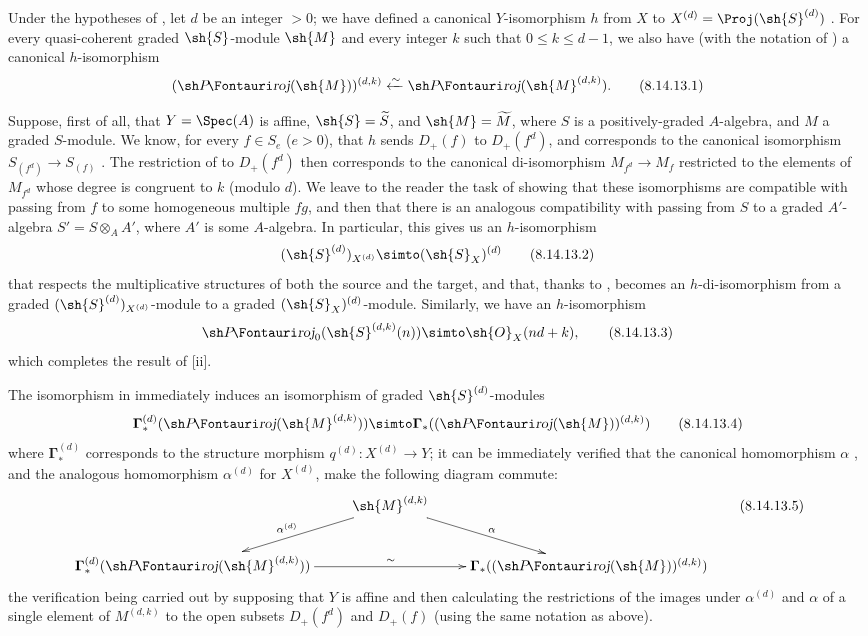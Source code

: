 \begin{remark}[8.14.13]
\label{II.8.14.13}
Under the hypotheses of , let $d$ be an integer $>0$;
we have defined a canonical $Y$-isomorphism $h$ from $X$ to $X^{(d)}=\Proj(\sh{S}^{(d)})$ .
For every
quasi-coherent graded $\sh{S}$-module $\sh{M}$ and every integer $k$ such that $0\leq k\leq d-1$, we also have (with the notation of ) a canonical $h$-isomorphism
\[
\label{II.8.14.13.1}
    (\shProj(\sh{M}))^{(d,k)} \xleftarrow{\sim} \shProj(\sh{M}^{(d,k)}).
\tag{8.14.13.1}
\]

Suppose, first of all, that $Y=\Spec(A)$ is affine, $\sh{S}=\widetilde{S}$, and $\sh{M}=\widetilde{M}$, where $S$ is a positively-graded $A$-algebra, and $M$ a graded $S$-module.
We know, for every $f\in S_e$ ($e>0$), that $h$ sends $D_+(f)$ to $D_+(f^d)$, and corresponds to the canonical isomorphism $S_{(f^d)}\to S_{(f)}$ .
The restriction of  to $D_+(f^d)$ then corresponds to the canonical di-isomorphism $M_{f^d}\to M_f$ restricted to the elements of $M_{f^d}$ whose degree is congruent to $k$ (modulo $d$).
We leave to the reader the task of showing that these isomorphisms are compatible with passing from $f$ to some homogeneous multiple $fg$, and then that there is an analogous compatibility with passing from $S$ to a graded $A'$-algebra $S'=S\otimes_A A'$, where $A'$ is some $A$-algebra.
In particular, this gives us an $h$-isomorphism
\[
\label{II.8.14.13.2}
    (\sh{S}^{(d)})_{X^{(d)}} \simto (\sh{S}_X)^{(d)}
\tag{8.14.13.2}
\]
that respects the multiplicative structures of both the source and the target, and that, thanks to , becomes an $h$-di-isomorphism from a graded $(\sh{S}^{(d)})_{X^{(d)}}$-module to a graded $(\sh{S}_X)^{(d)}$-module.
Similarly, we have an $h$-isomorphism
\[
\label{II.8.14.13.3}
    \shProj_0(\sh{S}^{(d,k)}(n)) \simto \sh{O}_X(nd+k),
\tag{8.14.13.3}
\]
which completes the result of [ii].

The isomorphism in  immediately induces an isomorphism of graded $\sh{S}^{(d)}$-modules
\[
\label{II.8.14.13.4}
    \boldsymbol{\Gamma}_*^{(d)}(\shProj(\sh{M}^{(d,k)})) \simto \boldsymbol{\Gamma}_*((\shProj(\sh{M}))^{(d,k)})
\tag{8.14.13.4}
\]
where $\boldsymbol{\Gamma}_*^{(d)}$ corresponds to the structure morphism $q^{(d)}:X^{(d)}\to Y$;
it can be immediately verified that the canonical homomorphism $\alpha$ , and the analogous homomorphism $\alpha^{(d)}$ for $X^{(d)}$, make the following diagram commute:
\[
\label{II.8.14.13.5}
    \xymatrix{
        &\sh{M}^{(d,k)} \ar[dl]_{\alpha^{(d)}} \ar[dr]^{\alpha}&
    \\  \boldsymbol{\Gamma}_*^{(d)}(\shProj(\sh{M}^{(d,k)})) \ar[rr]^{\sim}
        && \boldsymbol{\Gamma}_*((\shProj(\sh{M}))^{(d,k)})
    }
\tag{8.14.13.5}
\]
the verification being carried out by supposing that $Y$ is affine and then calculating the restrictions of the images under $\alpha^{(d)}$ and $\alpha$ of a single element of $M^{(d,k)}$ to the open subsets $D_+(f^d)$ and $D_+(f)$ (using the same notation as above).
\end{remark}

